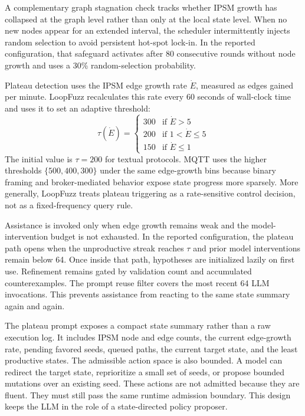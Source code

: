 \documentclass[final,5p,times,number]{elsarticle}
\begin{document}
A complementary graph stagnation check tracks whether IPSM growth has collapsed at the graph level rather than only at the local state level. When no new nodes appear for an extended interval, the scheduler intermittently injects random selection to avoid persistent hot-spot lock-in. In the reported configuration, that safeguard activates after 80 consecutive rounds without node growth and uses a 30\% random-selection probability.

Plateau detection uses the IPSM edge growth rate $\dot{E}$, measured as edges gained per minute. LoopFuzz recalculates this rate every 60 seconds of wall-clock time and uses it to set an adaptive threshold:
\[
\tau(\dot{E}) = \begin{cases}
300 & \text{if } \dot{E} > 5 \\
200 & \text{if } 1 < \dot{E} \le 5 \\
150 & \text{if } \dot{E} \le 1
\end{cases}
\]
The initial value is $\tau{=}200$ for textual protocols. MQTT uses the higher thresholds $\{500,400,300\}$ under the same edge-growth bins because binary framing and broker-mediated behavior expose state progress more sparsely. More generally, LoopFuzz treats plateau triggering as a rate-sensitive control decision, not as a fixed-frequency query rule.

Assistance is invoked only when edge growth remains weak and the model-intervention budget is not exhausted. In the reported configuration, the plateau path opens when the unproductive streak reaches $\tau$ and prior model interventions remain below 64. Once inside that path, hypotheses are initialized lazily on first use. Refinement remains gated by validation count and accumulated counterexamples. The prompt reuse filter covers the most recent 64 LLM invocations. This prevents assistance from reacting to the same state summary again and again.

The plateau prompt exposes a compact state summary rather than a raw execution log. It includes IPSM node and edge counts, the current edge-growth rate, pending favored seeds, queued paths, the current target state, and the least productive states. The admissible action space is also bounded. A model can redirect the target state, reprioritize a small set of seeds, or propose bounded mutations over an existing seed. These actions are not admitted because they are fluent. They must still pass the same runtime admission boundary. This design keeps the LLM in the role of a state-directed policy proposer.
\end{document}
